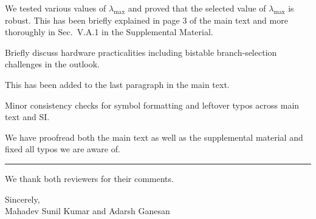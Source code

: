 \documentclass{ar2rc}
\begin{document}
	\AR We tested various values of $\lambda_{\max}$ and proved that the selected value of $\lambda_{\max}$ is robust. This has been briefly explained in page 3 of the main text and more thoroughly in Sec.~V.A.1 in the Supplemental Material.

	\RC Briefly discuss hardware practicalities including bistable branch-selection challenges in the outlook.

	\AR This has been added to the last paragraph in the main text.

	\RC Minor consistency checks for symbol formatting and leftover typos across main text and SI.

	\AR We have proofread both the main text as well as the supplemental material and fixed all typos we are aware of.

	\noindent\rule{\textwidth}{0.4pt}

	We thank both reviewers for their comments.

	Sincerely,\\
	Mahadev Sunil Kumar and Adarsh Ganesan
\end{document}
